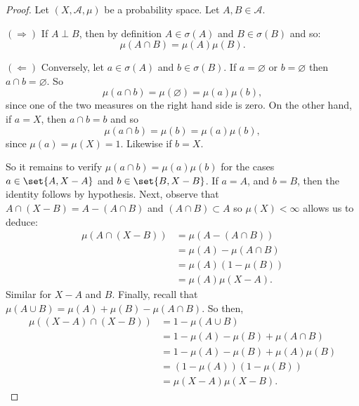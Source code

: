 \begin{proof}Let $(X, \mathcal{A} , \mu )$ be a probability space.
Let $A, B \in \mathcal{A} $.

$(\Rightarrow)$ If $A \perp  B$, then by definition $A \in \sigma (A)$ and $B \in \sigma (B)$ and so:
\[
\mu (A \cap  B) = \mu (A)\mu (B).
\]

$(\Leftarrow)$ Conversely, let $a \in \sigma (A)$ and $b \in \sigma (B)$.
If $a = \varnothing$ or $b = \varnothing$ then $a \cap  b = \varnothing$.
So
\[
\mu (a \cap  b) = \mu (\varnothing) = \mu (a)\mu (b),
\]
since one of the two measures on the right hand side is zero.
On the other hand, if $a = X$, then $a \cap  b = b$ and so
\[
\mu (a \cap  b) = \mu (b) = \mu (a)\mu (b),
\]
since $\mu (a) = \mu (X) = 1$.
Likewise if $b = X$.

So it remains to verify $\mu (a \cap  b) = \mu (a)\mu (b)$ for the cases $a \in \set{A,X -A}$ and $b \in \set{B, X-B}$.
If $a = A$, and $b = B$, then the identity follows by hypothesis.
Next, observe that $A \cap  (X - B) = A - (A \cap  B)$ and $(A \cap  B) \subset A$ so $\mu (X) < \infty$ allows us to deduce:
\[
\begin{aligned}
\mu (A \cap  (X - B)) &= \mu (A - (A \cap  B)) \\
&= \mu (A) - \mu (A \cap  B) \\
&= \mu (A)(1 - \mu (B)) \\
&= \mu (A)\mu (X - A).
\end{aligned}
\]
Similar for $X-A$ and $B$.
Finally, recall that $\mu (A \cup B) = \mu (A) + \mu (B) - \mu (A \cap  B)$.
So then,
\[
\begin{aligned}
\mu ((X - A) \cap  (X - B)) &= 1 - \mu (A \cup B) \\
&= 1 - \mu (A) - \mu (B) + \mu (A \cap  B) \\
&= 1 - \mu (A) - \mu (B) + \mu (A)\mu (B) \\
&= (1 - \mu (A))(1 - \mu (B)) \\
&= \mu (X - A)\mu (X - B).
\end{aligned}
\]
\end{proof}

